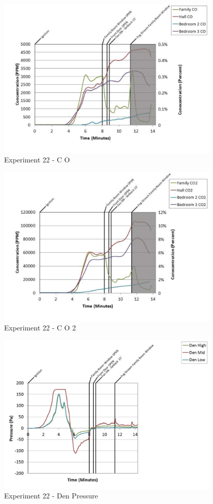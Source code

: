 \documentclass{article}
\begin{document}
\begin{appendices}
	\clearpage

	\begin{figure}[h!]
		\centering
		\includegraphics[height=3.05in]{0_Images/Results_Charts/Exp_22_Charts/CO.pdf}
		\caption{Experiment 22 - C O}
	\end{figure}
 

	\begin{figure}[h!]
		\centering
		\includegraphics[height=3.05in]{0_Images/Results_Charts/Exp_22_Charts/CO2.pdf}
		\caption{Experiment 22 - C O 2}
	\end{figure}
 
	\clearpage

	\begin{figure}[h!]
		\centering
		\includegraphics[height=3.05in]{0_Images/Results_Charts/Exp_22_Charts/DenPressure.pdf}
		\caption{Experiment 22 - Den Pressure}
	\end{figure}
 


\end{appendices}
\end{document}
